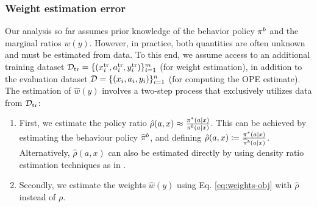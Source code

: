 \subsubsection{Weight estimation error}\label{subsec:weight-estimation-error}
Our analysis so far assumes prior knowledge of the behavior policy $\pi^b$ and the marginal ratios $w(y)$. However, in practice, both quantities are often unknown and must be estimated from data. To this end, we assume access to an additional training dataset $\mathcal{D}_{\textup{tr}} = \{(x^{\textup{tr}}_i, a^{\textup{tr}}_i, y^{\textup{tr}}_i)\}_{i=1}^m$ (for weight estimation), in addition to the evaluation dataset $\mathcal{D} = \{(x_i, a_i, y_i)\}_{i=1}^n$ (for computing the OPE estimate). 
The estimation of $\hat{w}(y)$ involves a two-step process that exclusively utilizes data from $\mathcal{D}_{\textup{tr}}$:
\begin{enumerate}[label=(\roman*)]
    \item First, we estimate the policy ratio $\hat{\rho}(a, x) \approx \frac{\pi^*(a | x)}{\pi^b(a | x)}$. This can be achieved by estimating the behaviour policy $\widehat{\pi}^b$, and defining $\hat{\rho}(a, x)\coloneqq \frac{\pi^*(a\mid x)}{\widehat{\pi}^b(a\mid x)}$. Alternatively, $\hat{\rho}(a, x)$ can also be estimated directly by using density ratio estimation techniques as in \cite{sondhi2020balanced}.
    \item Secondly, we estimate the weights $\hat{w}(y)$ using Eq. \eqref{eq:weights-obj} with $\hat{\rho}$ instead of $\rho$.
\end{enumerate}

